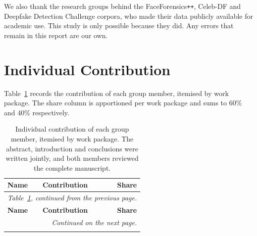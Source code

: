 \documentclass[journal,onecolumn]{IEEEtran}
\newcommand{\celebdf}{Celeb-DF}
\begin{document}
We also thank the research groups behind the FaceForensics\texttt{++},
\celebdf{} and Deepfake Detection Challenge corpora, who made their data
publicly available for academic use. This study is only possible because they
did. Any errors that remain in this report are our own.

\section{Individual Contribution}
\label{sec:contrib}

Table~\ref{tab:contrib} records the contribution of each group member, itemised
by work package. The share column is apportioned per work package and sums to
60\% and 40\% respectively.

{\footnotesize
\setlength{\tabcolsep}{5pt}
\begin{longtable}{p{30mm}p{88mm}r}
\caption{Individual contribution of each group member, itemised by work package.
The abstract, introduction and conclusions were written jointly, and both members
reviewed the complete manuscript.}
\label{tab:contrib} \\
\toprule
\textbf{Name} & \textbf{Contribution} & \textbf{Share} \\
\midrule
\endfirsthead

\multicolumn{3}{l}{\emph{Table~\ref{tab:contrib}, continued from the previous
page.}} \\[2pt]
\toprule
\textbf{Name} & \textbf{Contribution} & \textbf{Share} \\
\midrule
\endhead

\midrule
\multicolumn{3}{r}{\emph{Continued on the next page.}} \\
\endfoot

\bottomrule
\endlastfoot


\end{longtable}}
\end{document}
